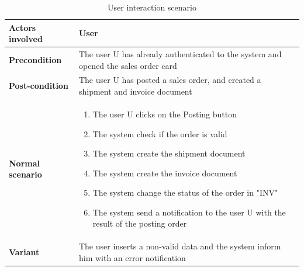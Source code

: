 \begin{table}
    \centering
    \begin{tabular}{|l|p{10cm}|}
        \hline
        \textbf{Actors involved} & User                                                                                   \\
        \hline
        \textbf{Precondition}    & The user U has already authenticated to the system and opened the sales order card     \\
        \hline
        \textbf{Post-condition}  & The user U has posted a sales order, and created a shipment and invoice document       \\
        \hline
        \textbf{Normal scenario} &
        \begin{enumerate}
            \item The user U clicks on the Posting button
            \item The system check if the order is valid
            \item The system create the shipment document
            \item The system create the invoice document
            \item The system change the status of the order in "INV"
            \item The system send a notification to the user U with the result of the posting order
        \end{enumerate}                            \\
        \hline
        \textbf{Variant}         & The user inserts a non-valid data and the system inform him with an error notification \\
        \hline
    \end{tabular}
    \caption{User interaction scenario}
    \label{tab:5_posting_order}
\end{table}
